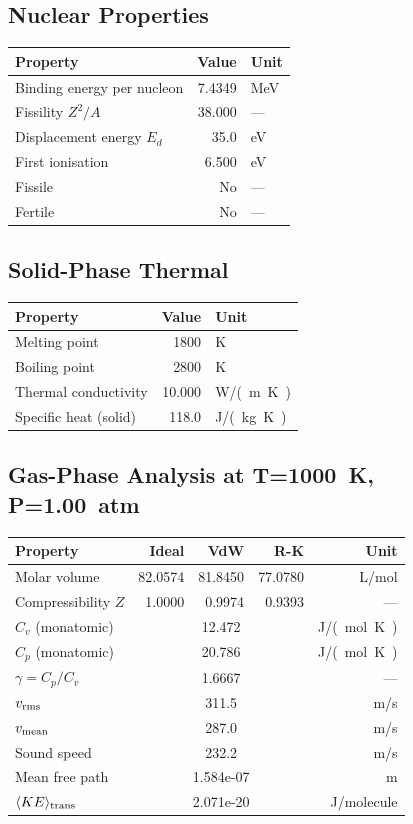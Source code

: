 \documentclass[11pt,a4paper]{article}
\begin{document}
\subsection{Nuclear Properties}
\begin{tabular}{lrl}
  \toprule
  Property & Value & Unit \\
  \midrule
  Binding energy per nucleon & 7.4349 & \si{MeV} \\
  Fissility $Z^2/A$ & 38.000 & --- \\
  Displacement energy $E_d$ & 35.0 & \si{eV} \\
  First ionisation & 6.500 & \si{eV} \\
  Fissile & No & --- \\
  Fertile & No & --- \\
  \bottomrule
\end{tabular}

\subsection{Solid-Phase Thermal}
\begin{tabular}{lrl}
  \toprule
  Property & Value & Unit \\
  \midrule
  Melting point & 1800 & \si{K} \\
  Boiling point & 2800 & \si{K} \\
  Thermal conductivity & 10.000 & \si{W/(m.K)} \\
  Specific heat (solid) & 118.0 & \si{J/(kg.K)} \\
  \bottomrule
\end{tabular}

\subsection{Gas-Phase Analysis at T=\SI{1000}{K}, P=\SI{1.00}{atm}}
\begin{tabular}{lrrrr}
  \toprule
  Property & Ideal & VdW & R-K & Unit \\
  \midrule
  Molar volume & 82.0574 & 81.8450 & 77.0780 & \si{L/mol} \\
  Compressibility $Z$ & 1.0000 & 0.9974 & 0.9393 & --- \\
  \midrule
  $C_v$ (monatomic) & \multicolumn{3}{c}{12.472} & \si{J/(mol.K)} \\
  $C_p$ (monatomic) & \multicolumn{3}{c}{20.786} & \si{J/(mol.K)} \\
  $\gamma = C_p/C_v$ & \multicolumn{3}{c}{1.6667} & --- \\
  $v_{\rm rms}$ & \multicolumn{3}{c}{311.5} & \si{m/s} \\
  $v_{\rm mean}$ & \multicolumn{3}{c}{287.0} & \si{m/s} \\
  Sound speed & \multicolumn{3}{c}{232.2} & \si{m/s} \\
  Mean free path & \multicolumn{3}{c}{1.584e-07} & \si{m} \\
  $\langle KE \rangle_{\rm trans}$ & \multicolumn{3}{c}{2.071e-20} & \si{J/molecule} \\
  \bottomrule
\end{tabular}
\end{document}
